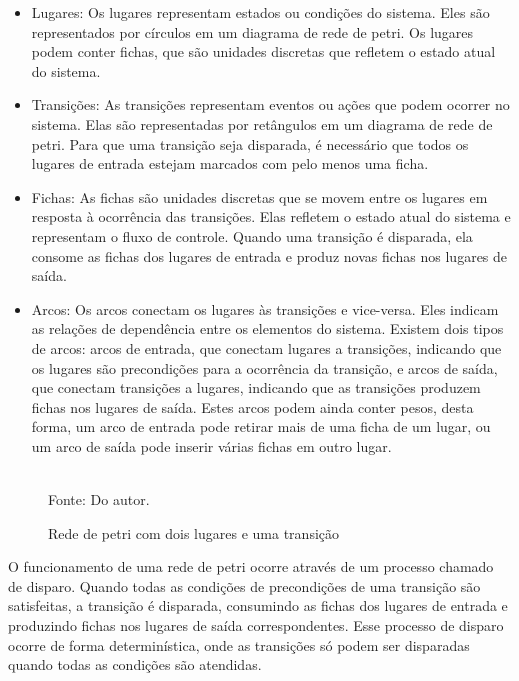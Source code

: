 \begin{itemize}
	\item Lugares: Os lugares representam estados ou condições do sistema. Eles são representados por círculos em um diagrama de rede de petri. Os lugares podem conter fichas, que são unidades discretas que refletem o estado atual do sistema.
	
	\item Transições: As transições representam eventos ou ações que podem ocorrer no sistema. Elas são representadas por retângulos em um diagrama de rede de petri. Para que uma transição seja disparada, é necessário que todos os lugares de entrada estejam marcados com pelo menos uma ficha.
	
	\item Fichas: As fichas são unidades discretas que se movem entre os lugares em resposta à ocorrência das transições. Elas refletem o estado atual do sistema e representam o fluxo de controle. Quando uma transição é disparada, ela consome as fichas dos lugares de entrada e produz novas fichas nos lugares de saída.
	
	\item Arcos: Os arcos conectam os lugares às transições e vice-versa. Eles indicam as relações de dependência entre os elementos do sistema. Existem dois tipos de arcos: arcos de entrada, que conectam lugares a transições, indicando que os lugares são precondições para a ocorrência da transição, e arcos de saída, que conectam transições a lugares, indicando que as transições produzem fichas nos lugares de saída. Estes arcos podem ainda conter pesos, desta forma, um arco de entrada pode retirar mais de uma ficha de um lugar, ou um arco de saída pode inserir várias fichas em outro lugar.
\end{itemize}

\begin{figure}[ht]
	\centering
	\caption{Rede de petri com dois lugares e uma transição}
	\\
	\label{fig:samplepetri}
	\footnotesize{Fonte: Do autor.}
\end{figure}

\pagebreak

O funcionamento de uma rede de petri ocorre através de um processo chamado de disparo. Quando todas as condições de precondições de uma transição são satisfeitas, a transição é disparada, consumindo as fichas dos lugares de entrada e produzindo fichas nos lugares de saída correspondentes. Esse processo de disparo ocorre de forma determinística, onde as transições só podem ser disparadas quando todas as condições são atendidas.

